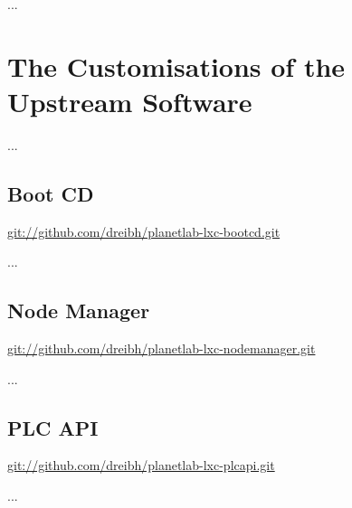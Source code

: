 ...




\chapter[The \noun{NorNet} Customisations]{The  Customisations of the Upstream  Software}
\label{cha:The-NorNet-Customisations-of-the-PlanetLab-Software}

...

\section{Boot CD}

\url{git://github.com/dreibh/planetlab-lxc-bootcd.git}

...


\section{Node Manager}
\label{sec:Node-Manager}

\url{git://github.com/dreibh/planetlab-lxc-nodemanager.git}

...


\section{PLC API}

\url{git://github.com/dreibh/planetlab-lxc-plcapi.git}

...


% 



